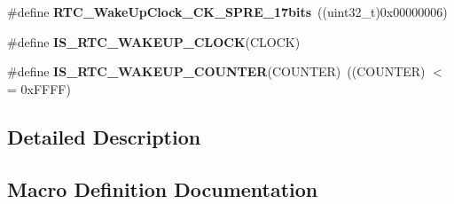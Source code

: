 \begin{DoxyCompactItemize}
\item 
\hypertarget{group___r_t_c___wakeup___timer___definitions_ga586423d0381e6822eaa030e9272708a2}{}\#define {\bfseries R\+T\+C\+\_\+\+Wake\+Up\+Clock\+\_\+\+C\+K\+\_\+\+S\+P\+R\+E\+\_\+17bits}~((uint32\+\_\+t)0x00000006)\label{group___r_t_c___wakeup___timer___definitions_ga586423d0381e6822eaa030e9272708a2}

\item 
\#define {\bfseries I\+S\+\_\+\+R\+T\+C\+\_\+\+W\+A\+K\+E\+U\+P\+\_\+\+C\+L\+O\+C\+K}(C\+L\+O\+C\+K)
\item 
\hypertarget{group___r_t_c___wakeup___timer___definitions_ga6254b48843bdcb83b5b5cd640aeb6f9c}{}\#define {\bfseries I\+S\+\_\+\+R\+T\+C\+\_\+\+W\+A\+K\+E\+U\+P\+\_\+\+C\+O\+U\+N\+T\+E\+R}(C\+O\+U\+N\+T\+E\+R)~((C\+O\+U\+N\+T\+E\+R) $<$= 0x\+F\+F\+F\+F)\label{group___r_t_c___wakeup___timer___definitions_ga6254b48843bdcb83b5b5cd640aeb6f9c}

\end{DoxyCompactItemize}


\subsection{Detailed Description}


\subsection{Macro Definition Documentation}
\hypertarget{group___r_t_c___wakeup___timer___definitions_gab847ce0346dc26930a3b2c1da3ed9e28}{}
